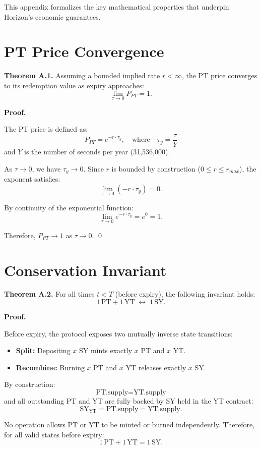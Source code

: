 
This appendix formalizes the key mathematical properties that underpin Horizon's economic guarantees.


\section{PT Price Convergence}

\textbf{Theorem A.1.}
Assuming a bounded implied rate $r < \infty$, the PT price converges to its redemption value as expiry approaches:
\[
\lim_{\tau \to 0} P_{PT} = 1.
\]

\textbf{Proof.}

The PT price is defined as:
\[
P_{PT} = e^{-r \cdot \tau_y},
\quad
\text{where}
\quad
\tau_y = \frac{\tau}{Y}
\]
and $Y$ is the number of seconds per year (31,536,000).

As $\tau \to 0$, we have $\tau_y \to 0$. Since $r$ is bounded by construction ($0 \le r \le r_{max}$), the exponent satisfies:
\[
\lim_{\tau \to 0} (-r \cdot \tau_y) = 0.
\]

By continuity of the exponential function:
\[
\lim_{\tau \to 0} e^{-r \cdot \tau_y} = e^{0} = 1.
\]

Therefore, $P_{PT} \to 1$ as $\tau \to 0$. \qed


\section{Conservation Invariant}

\textbf{Theorem A.2.}
For all times $t < T$ (before expiry), the following invariant holds:
\[
1 \, \text{PT} + 1 \, \text{YT} \;\longleftrightarrow\; 1 \, \text{SY}.
\]

\textbf{Proof.}

Before expiry, the protocol exposes two mutually inverse state transitions:

\begin{itemize}
\item \textbf{Split:} Depositing $x$ SY mints exactly $x$ PT and $x$ YT.
\item \textbf{Recombine:} Burning $x$ PT and $x$ YT releases exactly $x$ SY.
\end{itemize}

By construction:
\[
\text{PT.supply} = \text{YT.supply}
\]
and all outstanding PT and YT are fully backed by SY held in the YT contract:
\[
\text{SY}_{\text{YT}} = \text{PT.supply} = \text{YT.supply}.
\]

No operation allows PT or YT to be minted or burned independently. Therefore, for all valid states before expiry:
\[
1 \, \text{PT} + 1 \, \text{YT} = 1 \, \text{SY}.
\]

